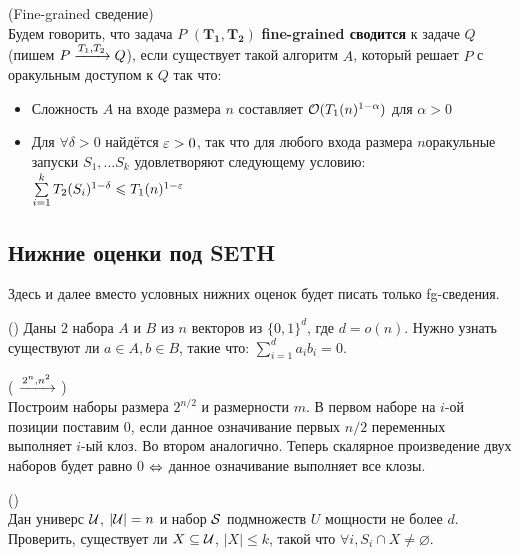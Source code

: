 \begin{definition}(Fine-grained сведение)\\
    Будем говорить, что задача $P$ $\mathbf{(T_1, T_2)}$ \textbf{fine-grained сводится} к задаче $Q$ (пишем $P \xrightarrow{T_1, T_2} Q$), если существует такой алгоритм $A$, который решает $P$ с оракульным доступом к $Q$ так что:
    \begin{itemize}
        \setlength\itemsep{-0.2em}
        \item Сложность $A$ на входе размера $n$ составляет $\mathcal{O}(T_1(n)^{1 - \alpha})$ для $\alpha > 0$
        \item Для $\forall \delta > 0$ найдётся $\varepsilon > 0$, так что для любого входа размера $n$оракульные запуски $S_1, \dots S_k$ удовлетворяют следующему условию: $\sum\limits_{i = 1}^k T_2(S_i)^{1 - \delta} \leqslant T_1(n)^{1 - \varepsilon}$
    \end{itemize}
\end{definition}

\subsection{Нижние оценки под SETH}

Здесь и далее вместо условных нижних оценок будет писать только fg-сведения. 

\begin{problem}()
   Даны $2$ набора $A$ и $B$ из $n$ векторов из $\{0, 1\}^d$, где $d = o(n)$. Нужно узнать существуют ли $a \in A, b \in B$, такие что: $\sum_{i = 1}^{d} a_i b_i = 0$.
\end{problem}

\begin{reduction}( $\xrightarrow{2^n, n^2}$ )~\cite{Patrascu2010}\\
    Построим наборы размера $2^{n/2}$ и размерности $m$. В первом наборе на $i$-ой позиции поставим 0, если данное означивание первых $n/2$ переменных выполняет $i$-ый клоз. Во втором аналогично. Теперь скалярное произведение двух наборов будет равно 0 $\Leftrightarrow$ данное означивание выполняет все клозы.
\end{reduction}

\begin{problem}()\\
   Дан универс $\mathcal{U}$, $|\mathcal{U}| = n$ и набор $\mathcal{S}$ подмножеств $U$ мощности не более $d$. Проверить, существует ли $X \subseteq \mathcal{U}$, $|X| \le k$, такой что $\forall i, S_i \cap X \neq \varnothing$.
\end{problem}


